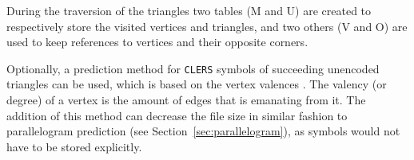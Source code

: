 During the traversion of the triangles two tables (M and U) are created to respectively store the visited vertices and triangles, and two others (V and O) are used to keep references to vertices and their opposite corners.

Optionally, a prediction method for \texttt{CLERS} symbols of succeeding unencoded triangles can be used, which is based on the vertex valences \citep{dracopredictive}.
The valency (or degree) of a vertex is the amount of edges that is emanating from it.
The addition of this method can decrease the file size in similar fashion to parallelogram prediction (see Section~\ref{sec:parallelogram}), as symbols would not have to be stored explicitly.


